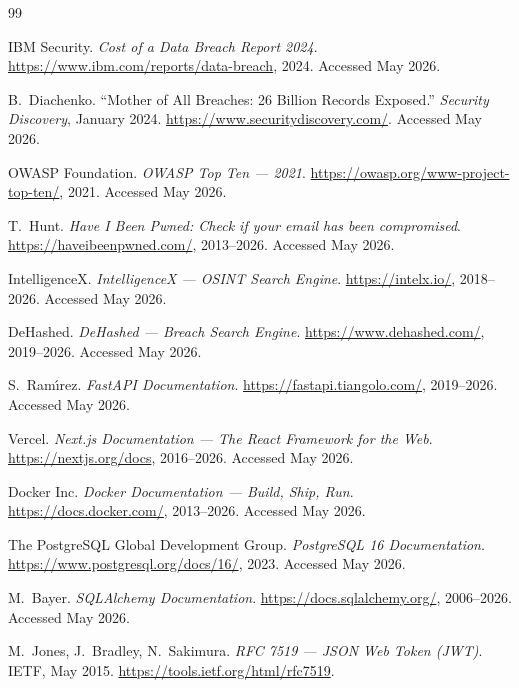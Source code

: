 \clearpage
{}

\begin{thebibliography}{99}

IBM Security.
\textit{Cost of a Data Breach Report 2024}.
\url{https://www.ibm.com/reports/data-breach}, 2024.
Accessed May 2026.

B.~Diachenko.
``Mother of All Breaches: 26 Billion Records Exposed.''
\textit{Security Discovery}, January 2024.
\url{https://www.securitydiscovery.com/}.
Accessed May 2026.

OWASP Foundation.
\textit{OWASP Top Ten --- 2021}.
\url{https://owasp.org/www-project-top-ten/}, 2021.
Accessed May 2026.

T.~Hunt.
\textit{Have I Been Pwned: Check if your email has been compromised}.
\url{https://haveibeenpwned.com/}, 2013--2026.
Accessed May 2026.

IntelligenceX.
\textit{IntelligenceX --- OSINT Search Engine}.
\url{https://intelx.io/}, 2018--2026.
Accessed May 2026.

DeHashed.
\textit{DeHashed --- Breach Search Engine}.
\url{https://www.dehashed.com/}, 2019--2026.
Accessed May 2026.

S.~Ram\'\i rez.
\textit{FastAPI Documentation}.
\url{https://fastapi.tiangolo.com/}, 2019--2026.
Accessed May 2026.

Vercel.
\textit{Next.js Documentation --- The React Framework for the Web}.
\url{https://nextjs.org/docs}, 2016--2026.
Accessed May 2026.

Docker Inc.
\textit{Docker Documentation --- Build, Ship, Run}.
\url{https://docs.docker.com/}, 2013--2026.
Accessed May 2026.

The PostgreSQL Global Development Group.
\textit{PostgreSQL 16 Documentation}.
\url{https://www.postgresql.org/docs/16/}, 2023.
Accessed May 2026.

M.~Bayer.
\textit{SQLAlchemy Documentation}.
\url{https://docs.sqlalchemy.org/}, 2006--2026.
Accessed May 2026.

M.~Jones, J.~Bradley, N.~Sakimura.
\textit{RFC 7519 --- JSON Web Token (JWT)}.
IETF, May 2015.
\url{https://tools.ietf.org/html/rfc7519}.


\end{thebibliography}
